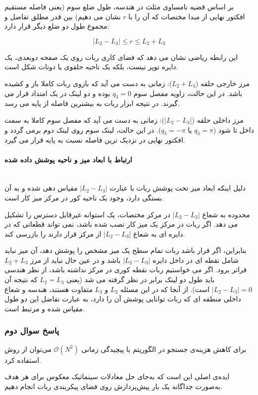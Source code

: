 \documentclass{article}
\begin{document}
بر اساس قضیه نامساوی مثلث در هندسه، طول ضلع سوم (یعنی فاصله مستقیم افکتور نهایی از مبدا مختصات که آن را با $ r $ نشان می دهیم) بین قدر مطلق تفاضل و مجموع طول دو ضلع دیگر قرار دارد:

\[
|L_2 - L_3| \le r \le L_2 + L_3
\]

این رابطه ریاضی نشان می دهد که فضای کاری ربات روی یک صفحه دوبعدی، یک دایره توپر نیست، بلکه یک ناحیه حلقوی یا دونات شکل است. 

مرز خارجی حلقه ($ L_2 + L_3 $): زمانی به دست می آید که بازوی ربات کاملا باز و کشیده باشد. در این حالت، زاویه مفصل سوم $ q_3 = 0 $ بوده و دو لینک در یک امتداد قرار می گیرند. در نتیجه ابزار ربات به بیشترین فاصله از پایه می رسد.

مرز داخلی حلقه ($ |L_2 - L_3| $): زمانی به دست می آید که مفصل سوم کاملا به سمت داخل تا شود ($ q_3 = \pi $ یا $ q_3 = -\pi $). در این حالت، لینک سوم روی لینک دوم برمی گردد و افکتور نهایی در نزدیک ترین فاصله نسبت به پایه قرار می گیرد. 

\paragraph{ارتباط با ابعاد میز و ناحیه پوشش داده شده}\mbox{}\\
دلیل اینکه ابعاد میز تحت پوشش ربات با عبارت $ |L_2 - L_3| $ مقیاس دهی شده و به آن بستگی دارد، وجود یک ناحیه کور در مرکز میز کار است. 

محدوده به شعاع $ |L_2 - L_3| $ در مرکز مختصات، یک استوانه غیرقابل دسترس را تشکیل می دهد. اگر ربات در مرکز یک میز کار نصب شده باشد، نمی تواند قطعاتی که در دایره ای به شعاع $ |L_2 - L_3| $ از مرکز قرار دارند را بازرسی کند. 

بنابراین، اگر قرار باشد ربات تمام سطح یک میز مشخص را پوشش دهد، آن میز نباید شامل نقطه ای در داخل دایره $ |L_2 - L_3| $ باشد و در عین حال نباید از مرز $ L_2 + L_3 $ فراتر برود. اگر می خواستیم ربات نقطه کوری در مرکز نداشته باشد، از نظر هندسی باید طول دو لینک برابر در نظر گرفته می شد (یعنی $ L_2 = L_3 $ که نتیجه آن $ |L_2 - L_3| = 0 $ است). از آنجا که در این مسئله $ L_2 $ و $ L_3 $ متفاوت هستند، هندسه و شعاع داخلی منطقه ای که ربات توانایی پوشش آن را دارد، به عبارت تفاضل این دو طول مقیاس شده و مرتبط است.
\subsubsection{پاسخ سوال دوم}
برای کاهش هزینه‌ی جستجو در الگوریتم با پیچیدگی زمانی $\mathcal{O}(N^2)$ می‌توان از روش  استفاده کرد.

ایده‌ی اصلی این است که به‌جای حل معادلات سینماتیک معکوس برای هر هدف به‌صورت جداگانه یک بار پیش‌پردازش روی فضای پیکربندی  ربات انجام دهیم.
\end{document}
